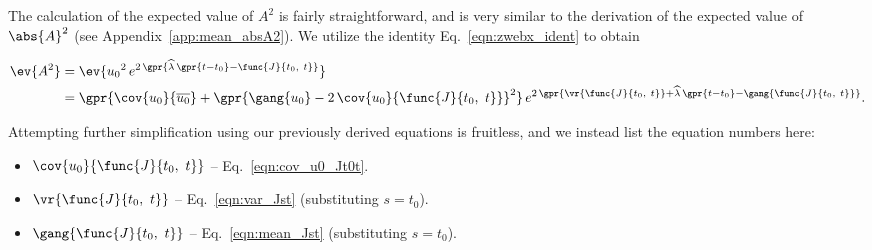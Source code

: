 The calculation of the expected value of $A^2$ is fairly straightforward, and is very similar to the derivation of the expected value of $\abs{A}^2$ (see Appendix~\ref{app:mean_absA2}). We utilize the identity Eq.~\ref{eqn:zwebx_ident} to obtain

\begin{align}
    \ev{A^2} &= \ev{{u_0}^2\,e^{2\,\gpr{\widehat{\lambda}\,\gpr{t - t_0} - \func{J}{t_0,\ t}}}} \nonumber \\
    	&= \gpr{\cov{u_0}{\overline{u_0}} + \gpr{\gang{u_0} - 2\,\cov{u_0}{\func{J}{t_0,\ t}}}^2}\,e^{2\,\gpr{\vr{\func{J}{t_0,\ t}} + \widehat{\lambda}\,\gpr{t - t_0} - \gang{\func{J}{t_0,\ t}}}}. \label{eqn:mean_A2}
\end{align}

Attempting further simplification using our previously derived equations is fruitless, and we instead list the equation numbers here:

\begin{itemize}
	\item [] $\cov{u_0}{\func{J}{t_0,\ t}}$ -- Eq.~\ref{eqn:cov_u0_Jt0t}.
	\item [] $\vr{\func{J}{t_0,\ t}}$ -- Eq.~\ref{eqn:var_Jst} (substituting $s = t_0$).
	\item [] $\gang{\func{J}{t_0,\ t}}$ -- Eq.~\ref{eqn:mean_Jst} (substituting $s = t_0$).
\end{itemize}

